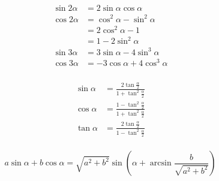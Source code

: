 \begin{theorem}
\begin{equation}
    \begin{aligned}    
        \sin 2\alpha &= 2 \sin\alpha \cos\alpha \\
        \cos 2\alpha &= \cos^2 \alpha - \sin^2 \alpha \\
        &= 2 \cos^2 \alpha - 1 \\
        &= 1 - 2 \sin^2 \alpha \\
        \sin 3\alpha &= 3 \sin\alpha - 4 \sin^3 \alpha \\
        \cos 3\alpha &= -3 \cos\alpha + 4 \cos^3 \alpha \\
    \end{aligned}
\end{equation}

\begin{equation}
    \begin{aligned}       
        \sin \alpha &= \frac{2 \tan \frac{\alpha}{2}}{1 + \tan^2 \frac{\alpha}{2}} \\
        \cos \alpha &= \frac{1 - \tan^2 \frac{\alpha}{2}}{1 + \tan^2 \frac{\alpha}{2}} \\
        \tan \alpha &= \frac{2 \tan \frac{\alpha}{2}}{1 - \tan^2 \frac{\alpha}{2}} \\  
    \end{aligned}
\end{equation}


\begin{equation}
    a \sin\alpha + b \cos\alpha = \sqrt{a^2 + b^2}\sin\left(\alpha + \arcsin\frac{b}{\sqrt{a^2 + b^2}}\right)
\end{equation}

\end{theorem}






































